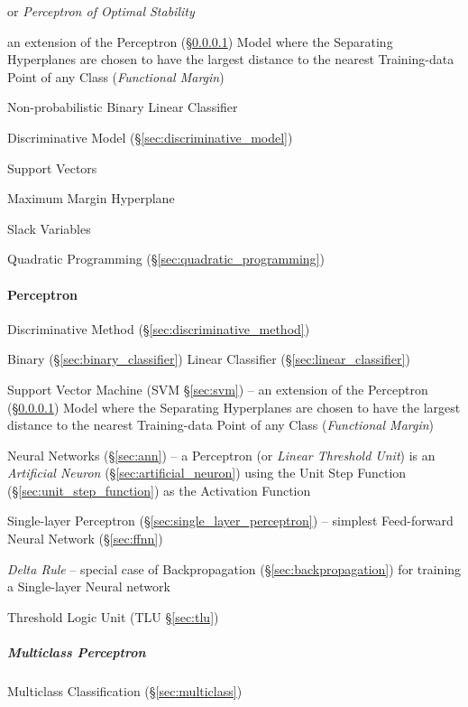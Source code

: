 or \emph{Perceptron of Optimal Stability}

an extension of the Perceptron (\S\ref{sec:perceptron}) Model where the
Separating Hyperplanes are chosen to have the largest distance to the nearest
Training-data Point of any Class (\emph{Functional Margin})

Non-probabilistic Binary Linear Classifier

Discriminative Model (\S\ref{sec:discriminative_model})

Support Vectors

Maximum Margin Hyperplane

Slack Variables

Quadratic Programming (\S\ref{sec:quadratic_programming})



\paragraph{Perceptron}\label{sec:perceptron}\hfill

Discriminative Method (\S\ref{sec:discriminative_method})

Binary (\S\ref{sec:binary_classifier}) Linear Classifier
(\S\ref{sec:linear_classifier})

\fist Support Vector Machine (SVM \S\ref{sec:svm}) -- an extension of the
Perceptron (\S\ref{sec:perceptron}) Model where the Separating Hyperplanes are
chosen to have the largest distance to the nearest Training-data Point of any
Class (\emph{Functional Margin})

\fist Neural Networks (\S\ref{sec:ann}) -- a Perceptron (or \emph{Linear
  Threshold Unit}) is an \emph{Artificial Neuron}
(\S\ref{sec:artificial_neuron}) using the Unit Step Function
(\S\ref{sec:unit_step_function}) as the Activation Function

\fist Single-layer Perceptron (\S\ref{sec:single_layer_perceptron})
-- simplest Feed-forward Neural Network (\S\ref{sec:ffnn})

\emph{Delta Rule} -- special case of Backpropagation
(\S\ref{sec:backpropagation}) for training a Single-layer Neural network

\fist Threshold Logic Unit (TLU \S\ref{sec:tlu})



\subparagraph{Multiclass Perceptron}\label{sec:multiclass_perceptron}\hfill

\fist Multiclass Classification (\S\ref{sec:multiclass})



